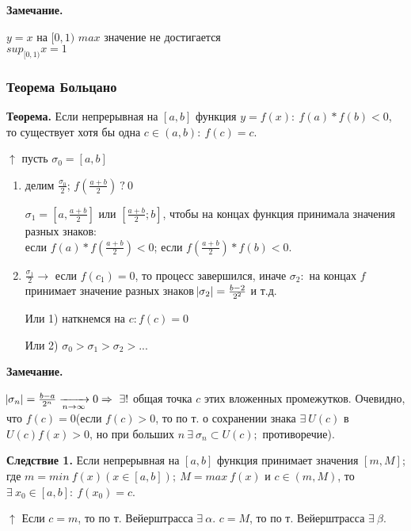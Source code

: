\documentclass{article}
\begin{document}
    \textbf{Замечание.} 

    \( y = x \) на \( [0, 1) \) \( max \) значение не достигается\\
    \( sup_{[0, 1)} x = 1 \)


    \subsubsection{Теорема Больцано}
    \textbf{Теорема.} Если непрерывная на \([a, b]\) функция \(y = f(x):\ f(a) * f(b) < 0\), то существует хотя бы одна \(c \in (a, b):\ f(c) = c\).

    \( \uparrow \) пусть \( \sigma_0 = [a, b] \)

    \begin{enumerate}
        \item делим \( \frac{\sigma_0}{2} \); \( f(\frac{a + b}{2})\ ?\ 0 \)
        
        \( \sigma_1 = [a, \frac{a + b}{2}] \) или \( [\frac{a + b}{2}; b] \), чтобы на концах функция принимала значения разных знаков:\\
        если \(f(a)*f(\frac{a+b}{2}) < 0\); если \(f(\frac{a+b}{2}) * f(b) < 0\).
        
        \item \( \frac{\sigma_1}{2} \rightarrow \) если \(f(c_1) = 0\), то процесс завершился, иначе \(\sigma_2:\) на концах \(f\) принимает значение разных знаков \( \abs{\sigma_2} = \frac{b - 2}{2^2} \) и т.д. 
        
        Или 1) наткнемся на \( c: f(c) = 0 \)
        
        Или 2) \( \sigma_0 > \sigma_1 > \sigma_2 > ... \)
    \end{enumerate}
    
    \textbf{Замечание.}

    \(\abs{\sigma_n} = \frac{b-a}{2^n} \xrightarrow[n \rightarrow \infty]{} 0 \Rightarrow\ \exists !\) общая точка \(c\) этих вложенных промежутков. Очевидно, что \(f(c) = 0\)(если \(f(c) > 0\), то по т. о сохранении знака \(\exists\ U(c)\) в \(U(c) f(x) > 0\), но при больших \(n\ \exists\ \sigma_n \subset U(c);\) противоречие).

    \textbf{Следствие 1.} Если непрерывная на \([a, b]\) функция принимает значения \([m, M]\); где \(m = min\ f(x)(x \in [a, b]);\ M = max\ f(x)\) и \(c \in (m, M)\), то \(\exists\ x_0 \in [a,b]:\ f(x_0) = c\).
    
    \( \uparrow \) Если \( c = m \), то по т. Вейерштрасса \( \exists\ \alpha \). \( c = M \), то по т. Вейерштрасса \( \exists\ \beta \).
\end{document}

